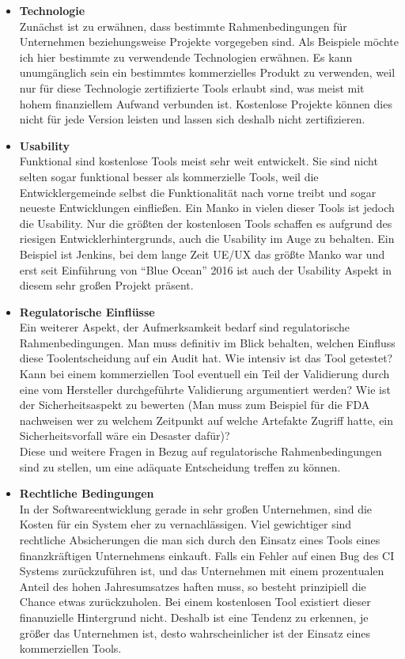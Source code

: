 \begin{itemize}
	\item \textbf{Technologie}\\
	Zunächst ist zu erwähnen, dass bestimmte Rahmenbedingungen für Unternehmen beziehungsweise Projekte vorgegeben sind. Als Beispiele möchte ich hier bestimmte zu verwendende Technologien erwähnen. Es kann unumgänglich sein ein bestimmtes kommerzielles Produkt zu verwenden, weil nur für diese Technologie zertifizierte Tools erlaubt sind, was meist mit hohem finanziellem Aufwand verbunden ist. Kostenlose Projekte können dies nicht für jede Version leisten und lassen sich deshalb nicht zertifizieren.
	\item \textbf{Usability}\\
	Funktional sind kostenlose Tools meist sehr weit entwickelt. Sie sind nicht selten sogar funktional besser als kommerzielle Tools, weil die Entwicklergemeinde selbst die Funktionalität nach vorne treibt und sogar neueste Entwicklungen einfließen. Ein Manko in vielen dieser Tools ist jedoch die Usability. Nur die größten der kostenlosen Tools schaffen es aufgrund des riesigen Entwicklerhintergrunds, auch die Usability im Auge zu behalten. Ein Beispiel ist Jenkins, bei dem lange Zeit UE/UX das größte Manko war und erst seit Einführung von "`Blue Ocean"' 2016 ist auch der Usability Aspekt in diesem sehr großen Projekt präsent.
	\item \textbf{Regulatorische Einflüsse}\\
	Ein weiterer Aspekt, der Aufmerksamkeit bedarf sind regulatorische Rahmenbedingungen. Man muss definitiv im Blick behalten, welchen Einfluss diese Toolentscheidung auf ein Audit hat. Wie intensiv ist das Tool getestet? Kann bei einem kommerziellen Tool eventuell ein Teil der Validierung durch eine vom Hersteller durchgeführte Validierung argumentiert werden? Wie ist der Sicherheitsaspekt zu bewerten (Man muss zum Beispiel für die FDA nachweisen wer zu welchem Zeitpunkt auf welche Artefakte Zugriff hatte, ein Sicherheitsvorfall wäre ein Desaster dafür)?\\
	Diese und weitere Fragen in Bezug auf regulatorische Rahmenbedingungen sind zu stellen, um eine adäquate Entscheidung treffen zu können.
	\item \textbf{Rechtliche Bedingungen}\\
	In der Softwareentwicklung gerade in sehr großen Unternehmen, sind die Kosten für ein System eher zu vernachlässigen. Viel gewichtiger sind rechtliche Absicherungen die man sich durch den Einsatz eines Tools eines finanzkräftigen Unternehmens einkauft. Falls ein Fehler auf einen Bug des CI Systems zurückzuführen ist, und das Unternehmen mit einem prozentualen Anteil des hohen Jahresumsatzes haften muss, so besteht prinzipiell die Chance etwas zurückzuholen. Bei einem kostenlosen Tool existiert dieser finanuzielle Hintergrund nicht. Deshalb ist eine Tendenz zu erkennen, je größer das Unternehmen ist, desto wahrscheinlicher ist der Einsatz eines kommerziellen Tools.
	\end{itemize}
